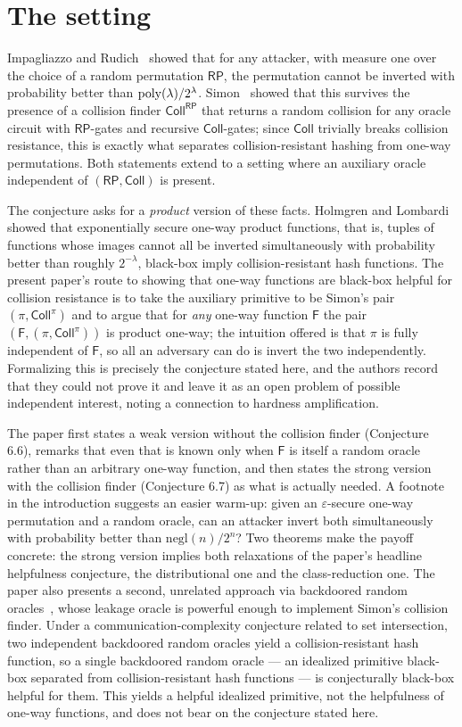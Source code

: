 \documentclass{aicr-conjecture}
\newcommand{\Fo}{\mathsf{F}}          %
\newcommand{\RP}{\mathsf{RP}}
\newcommand{\Coll}{\mathsf{Coll}}
\newcommand{\negl}{\mathrm{negl}}
\begin{document}
\section{The setting}\label{sec:setting}

Impagliazzo and Rudich~\cite{IR89} showed that for any attacker, with
measure one over the choice of a random permutation $\RP$, the permutation
cannot be inverted with probability better than
$\mathrm{poly}(\lambda)/2^{\lambda}$. Simon~\cite{Sim98} showed that this survives
the presence of a collision finder $\Coll^{\RP}$ that returns a random
collision for any oracle circuit with $\RP$-gates and recursive
$\Coll$-gates; since $\Coll$ trivially breaks collision resistance, this is
exactly what separates collision-resistant hashing from one-way
permutations. Both statements extend to a setting where an auxiliary oracle
independent of $(\RP,\Coll)$ is present.

The conjecture asks for a \emph{product} version of these facts. Holmgren
and Lombardi~\cite{HL18} showed that exponentially secure one-way product
functions, that is, tuples of functions whose images cannot all be inverted
simultaneously with probability better than roughly $2^{-\lambda}$,
black-box imply collision-resistant hash functions. The present paper's
route to showing that one-way functions are black-box helpful for collision
resistance is to take the auxiliary primitive to be Simon's pair
$(\pi,\Coll^{\pi})$ and to argue that for \emph{any} one-way function
$\Fo$ the pair $(\Fo,(\pi,\Coll^{\pi}))$ is product one-way; the intuition
offered is that $\pi$ is fully independent of $\Fo$, so all an adversary
can do is invert the two independently. Formalizing this is precisely the
conjecture stated here, and the authors record that they could not prove it
and leave it as an open problem of possible independent interest, noting a
connection to hardness amplification.

The paper first states a weak version without the collision finder
(Conjecture 6.6), remarks that even that is known only when $\Fo$ is itself
a random oracle rather than an arbitrary one-way function, and then states
the strong version with the collision finder (Conjecture 6.7) as what is
actually needed. A footnote in the introduction suggests an easier warm-up:
given an $\varepsilon$-secure one-way permutation and a random oracle, can
an attacker invert both simultaneously with probability better than
$\negl(n)/2^{n}$? Two theorems make the payoff concrete: the strong version
implies both relaxations of the paper's headline helpfulness conjecture,
the distributional one and the class-reduction one. The paper also presents
a second, unrelated approach via backdoored random oracles~\cite{BFM18},
whose leakage oracle is powerful enough to implement Simon's collision
finder. Under a communication-complexity conjecture related to set
intersection, two independent backdoored random oracles yield a
collision-resistant hash function, so a single backdoored random oracle
--- an idealized primitive black-box separated from collision-resistant
hash functions --- is conjecturally black-box helpful for them. This yields
a helpful idealized primitive, not the helpfulness of one-way functions,
and does not bear on the conjecture stated here.
\end{document}
